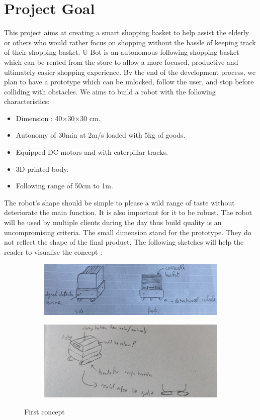 \section{Project Goal}

This project aims at creating a smart shopping basket to help assist the elderly or others who would rather focus on shopping without the hassle of keeping track of their shopping basket. U-Bot is an autonomous following shopping basket which can be rented from the store to allow a more focused, productive and ultimately easier shopping experience. By the end of the development process, we plan to have a prototype which can be unlocked, follow the user, and stop before colliding with obstacles. We aims to build a robot with the following characteristics:
\begin{itemize}
	\item Dimension : 40$\times$30$\times$30 cm.
	\item Autonomy of 30min at 2m/s loaded with 5kg of goods.
	\item Equipped DC motors and with caterpillar tracks.  
	\item 3D printed body.
	\item Following range of 50cm to 1m.
\end{itemize}

The robot's shape should be simple to please a wild range of taste without deteriorate the main function. It is also important for it to be robust. The robot will be used by multiple clients during the day thus build quality is an uncompromising criteria. The small dimension stand for the prototype. They do not reflect the shape of the final product. The following sketches will help the reader to visualise the concept :

\begin{figure}[h!]
	\centering
	\begin{subfigure}{.5\textwidth}
		\centering
		\includegraphics[scale = 0.2]{IMGs/CONCEPT1}	
	\end{subfigure}%
	\begin{subfigure}{0.5\textwidth}
		\centering	
		\includegraphics[scale = 0.3]{IMGs/CONCEPT2}
	\end{subfigure}
	\caption{First concept}
\end{figure}

